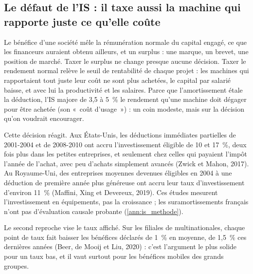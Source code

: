 \documentclass[11pt,a4paper]{article}
\begin{document}
\subsection{Le défaut de l'IS : il taxe aussi la machine qui rapporte juste ce qu'elle coûte}\label{sec:is_probleme}

Le bénéfice d'une société mêle la rémunération normale du capital engagé, ce que les financeurs auraient obtenu
ailleurs, et un surplus : une marque, un brevet, une position de marché. Taxer le surplus ne change presque aucune
décision. Taxer le rendement normal relève le seuil de rentabilité de chaque projet : les machines qui rapportaient
tout juste leur coût ne sont plus achetées, le capital par salarié baisse, et avec lui la productivité et les salaires.
Parce que l'amortissement étale la déduction, l'IS majore de 3,5 à 5~\% le rendement qu'une machine doit dégager pour
être achetée (son «~coût d'usage~») : un coin modeste, mais sur la décision qu'on voudrait encourager.

Cette décision réagit. Aux États-Unis, les déductions immédiates partielles de 2001-2004 et de 2008-2010 ont accru
l'investissement éligible de 10 et 17~\%, deux fois plus dans les petites entreprises, et seulement chez celles qui
payaient l'impôt l'année de l'achat, avec peu d'achats simplement avancés (Zwick et Mahon, 2017). Au Royaume-Uni, des
entreprises moyennes devenues éligibles en 2004 à une déduction de première année plus généreuse ont accru leur taux
d'investissement d'environ 11~\% (Maffini, Xing et Devereux, 2019). Ces études mesurent l'investissement en
équipements, pas la croissance ; les suramortissements français n'ont pas d'évaluation causale probante
(\ref{ann:is_methode}).

Le second reproche vise le taux affiché. Sur les filiales de multinationales, chaque point de taux fait baisser les
bénéfices déclarés de 1~\% en moyenne, de 1,5~\% ces dernières années (Beer, de Mooij et Liu, 2020) : c'est l'argument
le plus solide pour un taux bas, et il vaut surtout pour les bénéfices mobiles des grands groupes.
\end{document}
